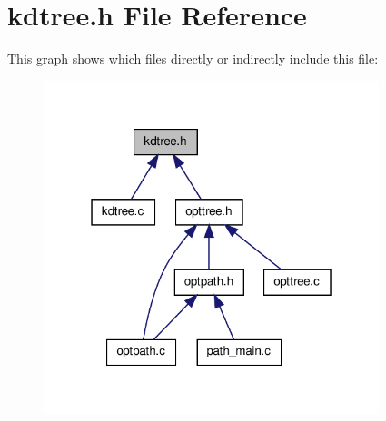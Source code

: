 \hypertarget{a00014}{\section{kdtree.\-h \-File \-Reference}
\label{d2/de7/a00014}
}
\-This graph shows which files directly or indirectly include this file\-:
\nopagebreak
\begin{figure}[H]
\begin{center}
\leavevmode
\includegraphics[width=277pt]{dc/de2/a00024}
\end{center}
\end{figure}
